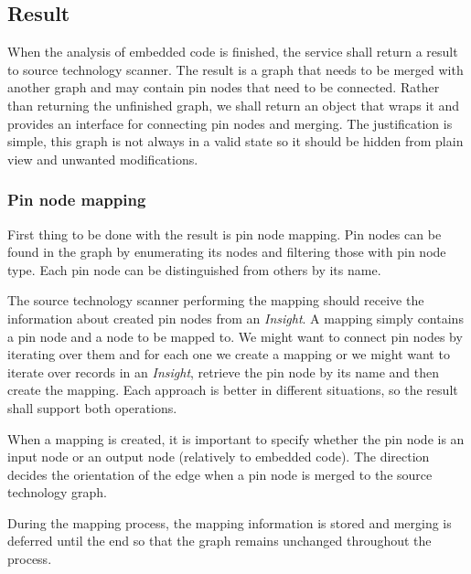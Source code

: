 \subsection{Result}

When the analysis of embedded code is finished, the service shall return a result to source technology scanner. The result is a graph that needs to be merged with another graph and may contain pin nodes that need to be connected. Rather than returning the unfinished graph, we shall return an object that wraps it and provides an interface for connecting pin nodes and merging. The justification is simple, this graph is not always in a valid state so it should be hidden from plain view and unwanted modifications.

\subsubsection{Pin node mapping}
First thing to be done with the result is pin node mapping. Pin nodes can be found in the graph by enumerating its nodes and filtering those with pin node type. Each pin node can be distinguished from others by its name.
\par
The source technology scanner performing the mapping should receive the information about created pin nodes from an \textit{Insight}. A mapping simply contains a pin node and a node to be mapped to. We might want to connect pin nodes by iterating over them and for each one we create a mapping or we might want to iterate over records in an \textit{Insight}, retrieve the pin node by its name and then create the mapping. Each approach is better in different situations, so the result shall support both operations.
\par
When a mapping is created, it is important to specify whether the pin node is an input node or an output node (relatively to embedded code). The direction decides the orientation of the edge when a pin node is merged to the source technology graph.
\par
During the mapping process, the mapping information is stored and merging is deferred until the end so that the graph remains unchanged throughout the process.

